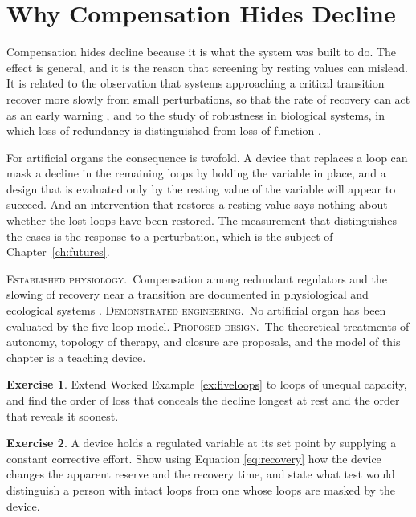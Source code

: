 \documentclass[11pt,openany]{book}
\theoremstyle{definition}
\newtheorem{exercise}{Exercise}[chapter]
\theoremstyle{remark}
\newcommand{\est}{\textsc{Established physiology.}\ }
\newcommand{\dem}{\textsc{Demonstrated engineering.}\ }
\newcommand{\pro}{\textsc{Proposed design.}\ }
\begin{document}
\section{Why Compensation Hides Decline}

Compensation hides decline because it is what the system was built to do. The effect is general, and it is the reason that screening by resting values can mislead. It is related to the observation that systems approaching a critical transition recover more slowly from small perturbations, so that the rate of recovery can act as an early warning \cite{scheffer2009}, and to the study of robustness in biological systems, in which loss of redundancy is distinguished from loss of function \cite{kitano2004}.

For artificial organs the consequence is twofold. A device that replaces a loop can mask a decline in the remaining loops by holding the variable in place, and a design that is evaluated only by the resting value of the variable will appear to succeed. And an intervention that restores a resting value says nothing about whether the lost loops have been restored. The measurement that distinguishes the cases is the response to a perturbation, which is the subject of Chapter~\ref{ch:futures}.

\begin{evidence}
\est Compensation among redundant regulators and the slowing of recovery near a transition are documented in physiological and ecological systems \cite{scheffer2009,kitano2004}. \dem No artificial organ has been evaluated by the five-loop model. \pro The theoretical treatments of autonomy, topology of therapy, and closure \cite{flyxion2026autonomy,flyxion2026topther,flyxion2026closure} are proposals, and the model of this chapter is a teaching device.
\end{evidence}

\begin{exercise}
Extend Worked Example~\ref{ex:fiveloops} to loops of unequal capacity, and find the order of loss that conceals the decline longest at rest and the order that reveals it soonest.
\end{exercise}

\begin{exercise}
A device holds a regulated variable at its set point by supplying a constant corrective effort. Show using Equation \eqref{eq:recovery} how the device changes the apparent reserve and the recovery time, and state what test would distinguish a person with intact loops from one whose loops are masked by the device.
\end{exercise}
\end{document}

